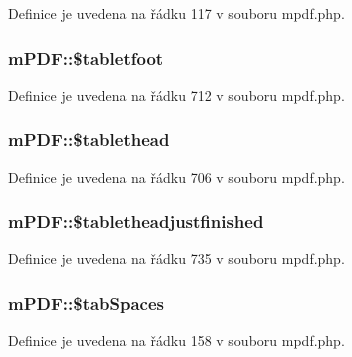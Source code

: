 Definice je uvedena na řádku 117 v souboru mpdf.\-php.

\hypertarget{classm_p_d_f_a045e73d3a265fe937444a3f05e10f7cc}{
\subsubsection[{\$tabletfoot}]{\setlength{\rightskip}{0pt plus 5cm}m\-P\-D\-F\-::\$tabletfoot}}\label{classm_p_d_f_a045e73d3a265fe937444a3f05e10f7cc}


Definice je uvedena na řádku 712 v souboru mpdf.\-php.

\hypertarget{classm_p_d_f_a34b7a7d409b4028619dc655e8c61dac5}{
\subsubsection[{\$tablethead}]{\setlength{\rightskip}{0pt plus 5cm}m\-P\-D\-F\-::\$tablethead}}\label{classm_p_d_f_a34b7a7d409b4028619dc655e8c61dac5}


Definice je uvedena na řádku 706 v souboru mpdf.\-php.

\hypertarget{classm_p_d_f_a4a981c285c96c6a28319c3b7483d5770}{
\subsubsection[{\$tabletheadjustfinished}]{\setlength{\rightskip}{0pt plus 5cm}m\-P\-D\-F\-::\$tabletheadjustfinished}}\label{classm_p_d_f_a4a981c285c96c6a28319c3b7483d5770}


Definice je uvedena na řádku 735 v souboru mpdf.\-php.

\hypertarget{classm_p_d_f_a26888a78726fdd478ba530ab066372a6}{
\subsubsection[{\$tab\-Spaces}]{\setlength{\rightskip}{0pt plus 5cm}m\-P\-D\-F\-::\$tab\-Spaces}}\label{classm_p_d_f_a26888a78726fdd478ba530ab066372a6}


Definice je uvedena na řádku 158 v souboru mpdf.\-php.

